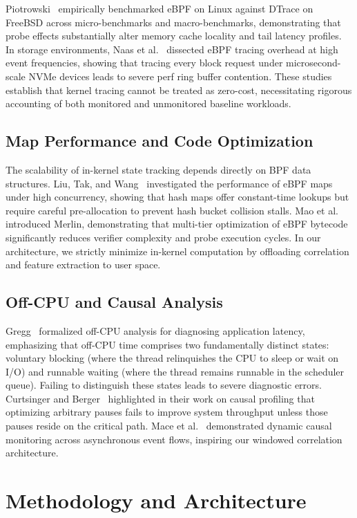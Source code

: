 \documentclass[conference]{IEEEtran}
\begin{document}
Piotrowski~\cite{piotrowski2024benchmarking} empirically benchmarked eBPF on Linux against DTrace on FreeBSD across micro-benchmarks and macro-benchmarks, demonstrating that probe effects substantially alter memory cache locality and tail latency profiles. In storage environments, Naas et al.~\cite{naas2026dissecting} dissected eBPF tracing overhead at high event frequencies, showing that tracing every block request under microsecond-scale NVMe devices leads to severe perf ring buffer contention. These studies establish that kernel tracing cannot be treated as zero-cost, necessitating rigorous accounting of both monitored and unmonitored baseline workloads.

\subsection{Map Performance and Code Optimization}
The scalability of in-kernel state tracking depends directly on BPF data structures. Liu, Tak, and Wang~\cite{liu2024understanding} investigated the performance of eBPF maps under high concurrency, showing that hash maps offer constant-time lookups but require careful pre-allocation to prevent hash bucket collision stalls. Mao et al.~\cite{mao2024merlin} introduced Merlin, demonstrating that multi-tier optimization of eBPF bytecode significantly reduces verifier complexity and probe execution cycles. In our architecture, we strictly minimize in-kernel computation by offloading correlation and feature extraction to user space.

\subsection{Off-CPU and Causal Analysis}
Gregg~\cite{gregg2019bpf} formalized off-CPU analysis for diagnosing application latency, emphasizing that off-CPU time comprises two fundamentally distinct states: voluntary blocking (where the thread relinquishes the CPU to sleep or wait on I/O) and runnable waiting (where the thread remains runnable in the scheduler queue). Failing to distinguish these states leads to severe diagnostic errors. Curtsinger and Berger~\cite{curtsinger2015coz} highlighted in their work on causal profiling that optimizing arbitrary pauses fails to improve system throughput unless those pauses reside on the critical path. Mace et al.~\cite{mace2015pivot} demonstrated dynamic causal monitoring across asynchronous event flows, inspiring our windowed correlation architecture.

\section{Methodology and Architecture}
\end{document}
